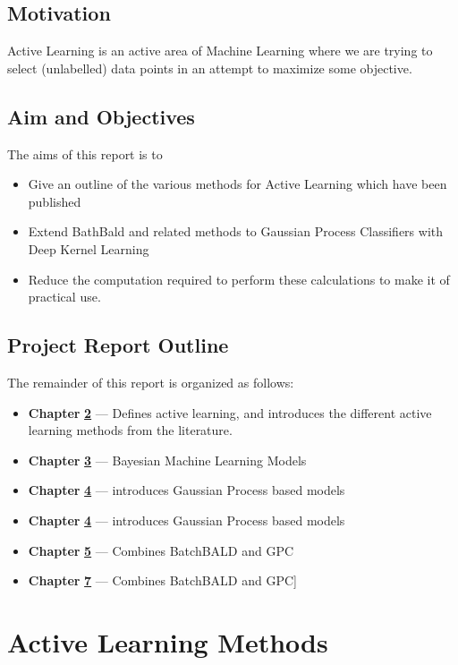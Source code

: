 \documentclass[12pt, a4paper]{report}
\theoremstyle{definition}
\theoremstyle{definition}
\theoremstyle{definition}
\begin{document}
\section{Motivation}

Active Learning is an active area of Machine Learning where we are trying to select (unlabelled) data points in an attempt to maximize some objective.
\section{Aim and Objectives}

The aims of this report is to

\begin{itemize}
    \item Give an outline of the various methods for Active Learning which have been published
    \item Extend BathBald and related methods to Gaussian Process Classifiers with Deep Kernel Learning
    \item Reduce the computation required to perform these calculations to make it of practical use.
\end{itemize}
\section{Project Report Outline}
The remainder of this report is organized as follows:
\begin{itemize}
    \item[] \textbf{Chapter} \hyperref[sec:ActiveLearning]{\textbf{2}} --- Defines active learning, and introduces the different active learning methods from the literature.
    \item[] \textbf{Chapter} \hyperref[sec:Models]{\textbf{3}} --- Bayesian Machine Learning Models
    \item[] \textbf{Chapter} \hyperref[sec:DUE]{\textbf{4}} --- introduces Gaussian Process based models
    \item[] \textbf{Chapter} \hyperref[sec:ActiveLearningWithDUE]{\textbf{4}} --- introduces Gaussian Process based models 
    \item[] \textbf{Chapter} \hyperref[sec:Implementation]{\textbf{5}} --- Combines BatchBALD and GPC
    \item[] \textbf{Chapter} \hyperref[sec:Experiments]{\textbf{7}} --- Combines BatchBALD and GPC] 
\end{itemize}


\chapter{Active Learning Methods}
\label{sec:ActiveLearning}
\end{document}
